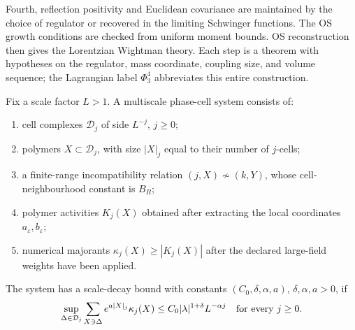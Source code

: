 Fourth, reflection positivity and Euclidean covariance are maintained by the
choice of regulator or recovered in the limiting Schwinger functions.  The
OS growth conditions are checked from uniform moment bounds.  OS
reconstruction then gives the Lorentzian Wightman theory.  Each step is a
theorem with hypotheses on the regulator, mass coordinate, coupling size, and
volume sequence; the Lagrangian label \(\Phi^4_3\) abbreviates this entire
construction.

\begin{definition}
\label{def:phi-four-three-abstract-phase-cell-system}
Fix a scale factor \(L>1\).  A multiscale phase-cell system consists of:
\begin{enumerate}[label=(\roman*)]
\item cell complexes \(\mathcal D_j\) of side \(L^{-j}\), \(j\geq0\);
\item polymers \(X\subset\mathcal D_j\), with size \(|X|_j\) equal to their
number of \(j\)-cells;
\item a finite-range incompatibility relation \((j,X)\nsim(k,Y)\), whose
cell-neighbourhood constant is \(B_R\);
\item polymer activities \(K_j(X)\) obtained after extracting the local
coordinates \(a_\varepsilon,b_\varepsilon\);
\item numerical majorants \(\kappa_j(X)\geq |K_j(X)|\) after the declared
large-field weights have been applied.
\end{enumerate}
The system has a scale-decay bound with constants
\((C_0,\delta,\alpha,a)\), \(\delta,\alpha,a>0\), if
\begin{equation}
  \sup_{\Delta\in\mathcal D_j}
  \sum_{X\ni\Delta}
  e^{a|X|_j}\kappa_j(X)
  \leq
  C_0|\lambda|^{1+\delta}L^{-\alpha j}
  \quad\hbox{for every }j\geq0 .
  \label{eq:phi-four-three-scale-decay-bound}
\end{equation}
\end{definition}

